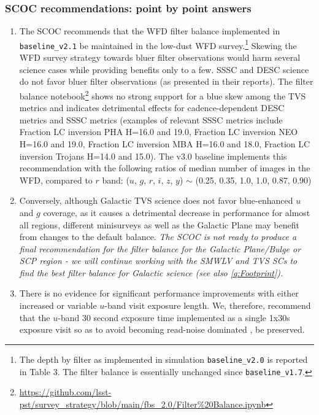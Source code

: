 \subsubsection{SCOC recommendations: point by point answers }\label{rec:filterdist}

\begin{enumerate}

\item The SCOC recommends that the WFD filter balance implemented in \texttt{baseline\_v2.1}  be maintained in the low-dust WFD survey.\footnote{The depth by filter as implemented in simulation \texttt{baseline\_v2.0} is reported in \citep{PSTN-054} Table 3. The filter balance is essentially unchanged since \texttt{baseline\_v1.7}.} Skewing the WFD survey strategy towards bluer filter observations would harm several science cases while providing benefits only to a few. 
SSSC and DESC science do not favor bluer filter observations (as presented in their reports).
The filter balance notebook\footnote{
\url{https://github.com/lsst-pst/survey_strategy/blob/main/fbs_2.0/Filter\%20Balance.ipynb}
} shows no strong support for a blue skew among the TVS metrics and indicates detrimental effects for cadence-dependent DESC metrics and SSSC metrics (examples of relevant SSSC metrics include Fraction LC inversion PHA H=16.0 and 19.0, Fraction LC inversion NEO H=16.0 and 19.0, Fraction LC inversion MBA H=16.0 and 18.0, Fraction LC inversion Trojans H=14.0 and 15.0). The v3.0 baseline implements this recommendation with the following ratios of median number of images in the WFD, compared to $r$ band: ($u$, $g$, $r$, $i$, $z$, $y$) $\sim$ (0.25, 0.35, 1.0, 1.0, 0.87, 0.90)


\item Conversely, although Galactic TVS science does not favor blue-enhanced $u$ and $g$ coverage, as it causes a detrimental decrease in performance for almost all regions,  different minisurveys as well as the Galactic Plane may benefit from changes to the default balance. \emph{The SCOC is not ready to produce a final recommendation for the filter balance for the Galactic Plane/Bulge or SCP region - we will continue working with the SMWLV and TVS SCs to find the best filter balance for Galactic science (see also \autoref{q:Footprint}).}

\item There is no evidence for significant performance improvements with either increased or variable $u$-band visit exposure length. We, therefore, recommend that the $u$-band 30 second exposure time implemented as a single 1x30s exposure visit so as to avoid becoming read-noise dominated \citep{PSTN-053},  be preserved.


\end{enumerate}
